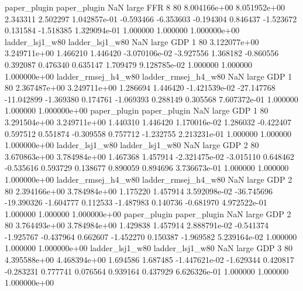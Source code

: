        paper_plugin        paper_plugin                   NaN      large      FFR                 8 80 8.004166e+00   8.051952e+00      2.343311       2.502297  1.042857e-01     -0.593466     -6.353603    -0.194304       0.846437 -1.523672   0.131584    -1.518385   1.329094e-01            1.000000        1.000000        1.000000e+00
    ladder_lsj1_w80     ladder_lsj1_w80                   NaN      large      GDP                 1 80 3.122077e+00   3.249711e+00      1.466210       1.446420 -3.070106e-02     -3.927556      1.368182    -0.860556       0.392087  0.476340   0.635147     1.709479   9.128785e-02            1.000000        1.000000        1.000000e+00
ladder_rmsej_h4_w80 ladder_rmsej_h4_w80                   NaN      large      GDP                 1 80 2.367487e+00   3.249711e+00      1.286694       1.446420 -1.421539e-02    -27.147768    -11.042899    -1.369380       0.174761 -1.069393   0.288149     0.305568   7.607372e-01            1.000000        1.000000        1.000000e+00
       paper_plugin        paper_plugin                   NaN      large      GDP                 1 80 3.291504e+00   3.249711e+00      1.440310       1.446420  1.170016e-02      1.286032     -0.422407     0.597512       0.551874 -0.309558   0.757712    -1.232755   2.213231e-01            1.000000        1.000000        1.000000e+00
    ladder_lsj1_w80     ladder_lsj1_w80                   NaN      large      GDP                 2 80 3.670863e+00   3.784984e+00      1.467368       1.457914 -2.321475e-02     -3.015110      0.648462    -0.535616       0.593729  0.138677   0.890059     0.894696   3.736673e-01            1.000000        1.000000        1.000000e+00
ladder_rmsej_h4_w80 ladder_rmsej_h4_w80                   NaN      large      GDP                 2 80 2.394166e+00   3.784984e+00      1.175220       1.457914  3.592098e-02    -36.745696    -19.390326    -1.604777       0.112533 -1.487983   0.140736    -0.681970   4.972522e-01            1.000000        1.000000        1.000000e+00
       paper_plugin        paper_plugin                   NaN      large      GDP                 2 80 3.764493e+00   3.784984e+00      1.429838       1.457914  2.888791e-02     -0.541374     -1.925767    -0.437964       0.662607 -1.452270   0.150387    -1.969582   5.239164e-02            1.000000        1.000000        1.000000e+00
    ladder_lsj1_w80     ladder_lsj1_w80                   NaN      large      GDP                 3 80 4.395588e+00   4.468394e+00      1.694586       1.687485 -1.447621e-02     -1.629344      0.420817    -0.283231       0.777741  0.076564   0.939164     0.437929   6.626326e-01            1.000000        1.000000        1.000000e+00
